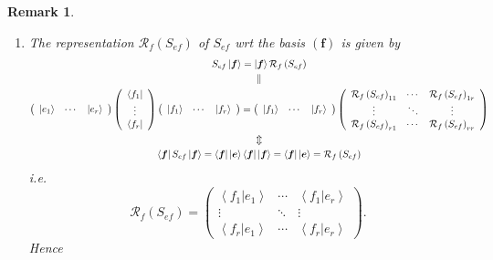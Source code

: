\documentclass[aps,preprint]{revtex4}
\newtheorem{remark}[theorem]{Remark}
\begin{document}
\begin{remark}
\begin{enumerate}
\begin{enumerate}
\item The representation $\mathcal{R}_{f}\left( S_{ef}\right) $ of $S_{ef}$
wrt the basis $\left( \boldsymbol{f}\right) $ is given by%
\begin{gather}
S_{ef}\left\vert \boldsymbol{f}\right\rangle =\left\vert \boldsymbol{f}%
\right\rangle \mathcal{R}_{f}\left( S_{ef}\right) \\
\parallel \\
\left( 
\begin{array}{ccc}
\left\vert e_{1}\right\rangle & \cdots & \left\vert e_{r}\right\rangle%
\end{array}%
\right) \left( 
\begin{array}{c}
\left\langle f_{1}\right\vert \\ 
\vdots \\ 
\left\langle f_{r}\right\vert%
\end{array}%
\right) \left( 
\begin{array}{ccc}
\left\vert f_{1}\right\rangle & \cdots & \left\vert f_{r}\right\rangle%
\end{array}%
\right) =\left( 
\begin{array}{ccc}
\left\vert f_{1}\right\rangle & \cdots & \left\vert f_{r}\right\rangle%
\end{array}%
\right) \left( 
\begin{array}{ccc}
\mathcal{R}_{f}\left( S_{ef}\right) _{11} & \cdots & \mathcal{R}_{f}\left(
S_{ef}\right) _{1r} \\ 
\vdots & \ddots & \vdots \\ 
\mathcal{R}_{f}\left( S_{ef}\right) _{r1} & \cdots & \mathcal{R}_{f}\left(
S_{ef}\right) _{rr}%
\end{array}%
\right) \\
\Updownarrow \\
\left\langle \boldsymbol{f}\right\vert S_{ef}\left\vert \boldsymbol{f}%
\right\rangle =\left\langle \boldsymbol{f}\right\vert \left\vert \boldsymbol{%
e}\right\rangle \left\langle \boldsymbol{f}\right\vert \left\vert 
\boldsymbol{f}\right\rangle =\left\langle \boldsymbol{f}\right\vert
\left\vert \boldsymbol{e}\right\rangle =\mathcal{R}_{f}\left( S_{ef}\right)
\end{gather}%
i.e. 
\begin{equation}
\mathcal{R}_{f}\left( S_{ef}\right) =\left( 
\begin{array}{ccc}
\left\langle \left. f_{1}\right\vert e_{1}\right\rangle & \cdots & 
\left\langle \left. f_{1}\right\vert e_{r}\right\rangle \\ 
\vdots & \ddots & \vdots \\ 
\left\langle \left. f_{r}\right\vert e_{1}\right\rangle & \cdots & 
\left\langle \left. f_{r}\right\vert e_{r}\right\rangle%
\end{array}%
\right) .
\end{equation}%
Hence


\end{enumerate}
\end{enumerate}
\end{remark}
\end{document}
